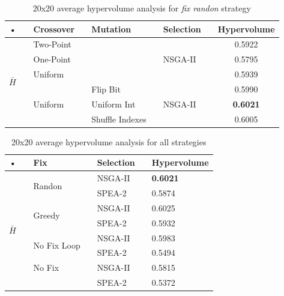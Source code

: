 \documentclass{llncs}
\begin{document}
\begin{table}
\caption{20x20 average hypervolume analysis for \textit{fix randon} strategy}
\label{tab:20x20avg}
\centering
\begin{tabular}{@{}lclclclc c @{}}
\toprule

• & \phantom{abc}  & Crossover & \phantom{abc}  & Mutation & \phantom{abc}  & Selection & \phantom{abc} & \multicolumn{1}{c}{Hypervolume}\\
 \midrule


\multirow{6}{*}{$\bar{H}$} & & Two-Point&  &  & & \multirow{3}{*}{NSGA-II} & &  0.5922 \\
 & & One-Point&  &  & &  & &  0.5795 \\
 & & Uniform&  &  & &  & &  0.5939\\\hhline{~~=======}
 & & \multirow{3}{*}{Uniform}&  & Flip Bit & & \multirow{3}{*}{NSGA-II} & &  0.5990 \\
 & & &  & Uniform Int & &  & &  \bf{0.6021} \\
 & & &  & Shuffle Indexes & &  & &  0.6005 \\


 \bottomrule
\end{tabular} 
\end{table}



\begin{table}
\caption{20x20 average hypervolume analysis for all strategies}
\label{tab:20x20comp}
\centering
\begin{tabular}{@{}lclclc l@{}}
\toprule

• & \phantom{abc}  & Fix & \phantom{abc}  & Selection & \phantom{abc} & \multicolumn{1}{c}{Hypervolume}\\
 \midrule


\multirow{8}{*}{$\bar{H}$} & & \multirow{2}{*}{Randon} & & NSGA-II & &  \bf{0.6021} \\
 & &  & & SPEA-2 & &  0.5874 \\[2ex]

 & & \multirow{2}{*}{Greedy}  & & NSGA-II & &  0.6025 \\
 & &  & & SPEA-2 & &   0.5932 \\[2ex]


 & & \multirow{2}{*}{No Fix Loop}  & & NSGA-II & &  0.5983 \\
 & &  & & SPEA-2 & &  0.5494 \\[2ex]


 & & No Fix &  & NSGA-II & &  0.5815 \\
 & &  & & SPEA-2 & &  0.5372 \\

 \bottomrule
\end{tabular} 
\end{table}
\end{document}
